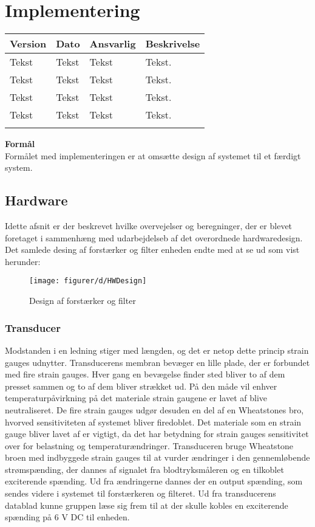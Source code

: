 \chapter{Implementering}\label{kapImp}

\begin{longtabu} to 
    Version &    Dato &    Ansvarlig &    Beskrivelse\\[-1ex]
    \midrule
    Tekst &    Tekst &    Tekst &    Tekst.\\
    Tekst &    Tekst &    Tekst &    Tekst.\\
    Tekst &    Tekst &    Tekst &    Tekst.\\
    Tekst &    Tekst &    Tekst &    Tekst.\\
\label{version_Produktet}
\end{longtabu}

\textbf{Formål}\\
Formålet med implementeringen er at omsætte design af systemet til et færdigt system. 


\section{Hardware}
Idette afsnit er der beskrevet hvilke overvejelser og beregninger, der er blevet foretaget i sammenhæng med udarbejdelseb af det overordnede hardwaredesign. 
Det samlede desing af forstærker og filter enheden endte med at se ud som vist herunder:

\begin{figure}[H]
    \centering
    \texttt{[image: figurer/d/HWDesign]}
    \caption{Design af forstærker og filter}
    \label{figtest_HW1}
\end{figure}

\subsection{Transducer}
Modstanden i en ledning stiger med længden, og det er netop dette princip strain gauges udnytter. 
Transducerens membran bevæger en lille plade, der er forbundet med fire strain gauges. 
Hver gang en bevægelse finder sted bliver to af dem presset sammen og to af dem bliver strækket ud.  
På den måde vil enhver temperaturpåvirkning på det materiale strain gaugene er lavet af blive neutraliseret. 
De fire strain gauges udgør desuden en del af en Wheatstones bro, hvorved sensitiviteten af systemet bliver firedoblet.
Det materiale som en strain gauge bliver lavet af er vigtigt, da det har betydning for strain gauges sensitivitet over for belastning og temperaturændringer.
Transduceren bruge Wheatstone broen med indbyggede strain gauges til at vurder ændringer i den gennemløbende strømspænding, der dannes af signalet fra blodtryksmåleren og en tilkoblet exciterende spænding. 
Ud fra ændringerne dannes der en output spænding, som sendes videre i systemet til forstærkeren og filteret.
Ud fra transducerens datablad kunne gruppen læse sig frem til at der skulle kobles en exciterende spænding på 6 V DC til enheden.

